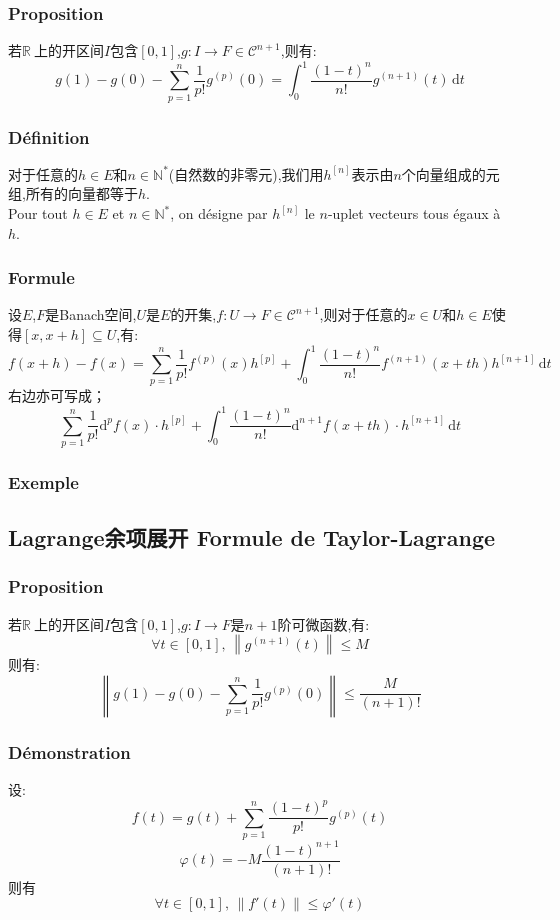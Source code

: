 \documentclass[12pt, a4paper, oneside]{ctexbook}
\newcommand{\di }{\text{d}}%
\newcommand{\R }{\mathbb{R}}%
\newcommand{\RR }{$\R\ $}%
\newcommand{\N }{\mathbb{N}}%
\newcommand{\fai }{\varphi}%
\newcommand{\C }{\mathcal{C}}%
\newcommand{\n }{$n$}\newcommand{\f  }{$ f $}
\begin{document}
  \subsubsection{Proposition}
  若\RR 上的开区间$I$包含$[0,1]$,$g:I\rightarrow F\in\C^{n+1}$,则有:
  $$
  g(1)-g(0)-\sum_{p=1}^{n}\frac{1}{p!}g^{(p)}(0)=
  \int_{0}^{1}\frac{(1-t)^n}{n!}g^{(n+1)}(t) \,\di t
  $$
  \subsubsection{Définition}
  对于任意的$h\in E$和$n \in\N^*$(自然数的非零元),我们用$h^{[n]}$表示由\n 个向量组成的元组,所有的向量都等于$h$.\\
  \indent
  Pour tout $h\in E$ et $n \in\N^*$, on désigne par $h^{[n]}$ le $n$-uplet vecteurs tous égaux à $h$.
  \subsubsection{Formule}
  设$E$,$F$是Banach空间,$U$是$E$的开集,$f:U\rightarrow F\in\C^{n+1}$,则对于任意的$x\in U$和$h\in E$使得$[x,x+h]\subseteq U$,有:
  $$
  f(x+h)-f(x)=\sum_{p=1}^{n}\frac{1}{p!}f^{(p)}(x)h^{[p]}+\int_{0}^{1}\frac{(1-t)^n}{n!}f^{(n+1)}(x+th)h^{[n+1]} \,\di t
  $$
  右边亦可写成；
  $$
  \sum_{p=1}^{n}\frac{1}{p!}\di^pf(x)\cdot h^{[p]}+\int_{0}^{1}\frac{(1-t)^n}{n!}\di^{n+1}f(x+th)\cdot h^{[n+1]} \,\di t
  $$
  \subsubsection{Exemple}
  \subsection{Lagrange余项展开 Formule de Taylor-Lagrange}
  \subsubsection{Proposition}
  若\RR 上的开区间$I$包含$[0,1]$,$g:I\rightarrow F$是${n+1}$阶可微函数,有:
  $$
  \forall t\in[0,1],\,\left\lVert g^{(n+1)}(t)\right\rVert \leq M
  $$
  则有:
  $$
  \left\lVert g(1)-g(0)-\sum_{p=1}^{n}\frac{1}{p!}g^{(p)}(0)\right\rVert \leq \frac{M}{(n+1)!}
  $$
  \subsubsection{Démonstration}
  设:
  $$
  f(t)=g(t)+\sum_{p=1}^{n}\frac{(1-t)^p}{p!}g^{(p)}(t)
  $$
  $$
  \fai(t)=-M\frac{(1-t)^{n+1}}{(n+1)!}
  $$
  则有
  $$
  \forall t\in[0,1],\,\left\lVert f'(t)\right\rVert \leq \fai'(t)
  $$
\end{document}
